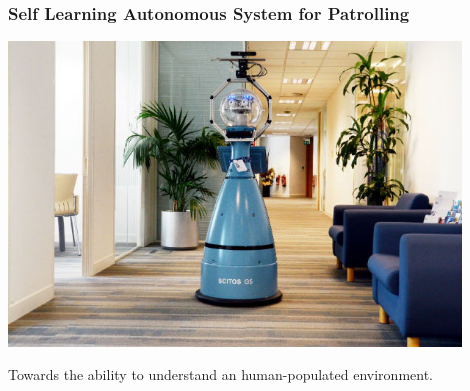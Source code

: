 \begin{frame}
	\frametitle{Self Learning Autonomous System for Patrolling}
    \vspace{3mm}
    \href{run:./video/Linda patrolling MHT office-_tXOevb51rc.mp4}{\includegraphics[width=0.9\textwidth]{fig/The-robot-Linda-at-Open-space-office-and-Bob-at-office-corridor.png}}
	\begin{center}
	Towards the ability to understand an human-populated environment.
	\end{center}
\end{frame}







